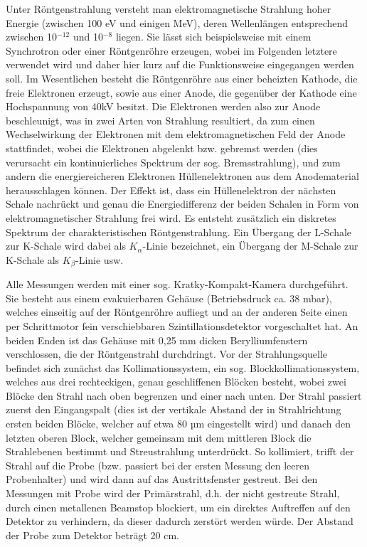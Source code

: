 \documentclass[bigchapter,colorback,accentcolor=tud4b,linedtoc,11pt]{tudreport}
\begin{document}
Unter Röntgenstrahlung versteht man elektromagnetische Strahlung hoher Energie (zwischen 100 eV und einigen MeV), deren Wellenlängen entsprechend zwischen 10$^{-12}$ und 10$^{-8}$ liegen. Sie lässt sich beispielsweise mit einem Synchrotron oder einer Röntgenröhre erzeugen, wobei im Folgenden letztere verwendet wird und daher hier kurz auf die Funktionsweise eingegangen werden soll. Im Wesentlichen besteht die Röntgenröhre aus einer beheizten Kathode, die freie Elektronen erzeugt, sowie aus einer Anode, die gegenüber der Kathode eine Hochspannung von 40kV besitzt. Die Elektronen werden also zur Anode beschleunigt, was in zwei Arten von Strahlung resultiert, da zum einen Wechselwirkung der Elektronen mit dem elektromagnetischen Feld der Anode stattfindet, wobei die Elektronen abgelenkt bzw. gebremst werden (dies verursacht ein kontinuierliches Spektrum der sog. Bremsstrahlung), und zum andern die energiereicheren Elektronen Hüllenelektronen aus dem Anodematerial herausschlagen können. Der Effekt ist, dass ein Hüllenelektron der nächsten Schale nachrückt und genau die Energiedifferenz der beiden Schalen in Form von elektromagnetischer Strahlung frei wird. Es entsteht zusätzlich ein diskretes Spektrum der charakteristischen Röntgenstrahlung. Ein Übergang der L-Schale zur K-Schale wird dabei als $K_{\alpha}$-Linie bezeichnet, ein Übergang der M-Schale zur K-Schale als $K_{\beta}$-Linie usw.

Alle Messungen werden mit einer sog. Kratky-Kompakt-Kamera durchgeführt. Sie besteht aus einem evakuierbaren Gehäuse (Betriebsdruck ca. 38 mbar), welches einseitig auf der Röntgenröhre aufliegt und an der anderen Seite einen per Schrittmotor fein verschiebbaren Szintillationsdetektor vorgeschaltet hat. An beiden Enden ist das Gehäuse mit 0,25 mm dicken Berylliumfenstern verschlossen, die der Röntgenstrahl durchdringt. Vor der Strahlungsquelle befindet sich zunächst das Kollimationssystem, ein sog. Blockkollimationssystem, welches aus drei rechteckigen, genau geschliffenen Blöcken besteht, wobei zwei Blöcke den Strahl nach oben begrenzen und einer nach unten. Der Strahl passiert zuerst den Eingangspalt (dies ist der vertikale Abstand der in Strahlrichtung ersten beiden Blöcke, welcher auf etwa 80 µm eingestellt wird) und danach den letzten oberen Block, welcher gemeinsam mit dem mittleren Block die Strahlebenen bestimmt und Streustrahlung unterdrückt. So kollimiert, trifft der Strahl auf die Probe (bzw. passiert bei der ersten Messung den leeren Probenhalter) und wird dann auf das Austrittsfenster gestreut. Bei den Messungen mit Probe wird der Primärstrahl, d.h. der nicht gestreute Strahl, durch einen metallenen Beamstop blockiert, um ein direktes Auftreffen auf den Detektor zu verhindern, da dieser dadurch zerstört werden würde. Der Abstand der Probe zum Detektor beträgt 20 cm.
\end{document}
